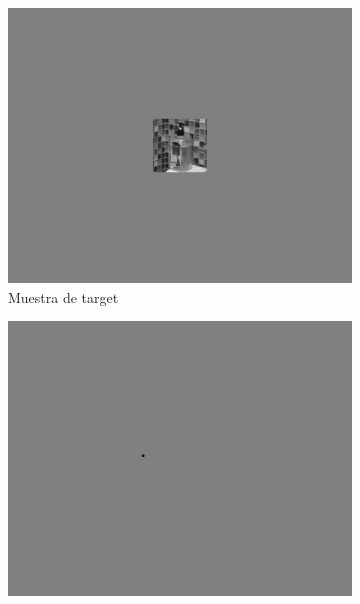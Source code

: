 \documentclass[compress]{beamer}
\begin{document}
\begin{frame}
\begin{figure}[!b]
    \captionsetup{font=scriptsize,labelfont=scriptsize}
    \centering
    \begin{subfigure}[b]{0.24\textwidth}
        \centering
        \includegraphics[width=\linewidth]{images/target_bathroom.jpg} 
        \caption{\tiny Muestra de target}
    \end{subfigure}
    \hfill
    \begin{subfigure}[b]{0.24\textwidth}
        \centering
        \includegraphics[width=\linewidth]{images/first_fixation_bien.jpg} 

\end{subfigure}
\end{figure}
\end{frame}
\end{document}
